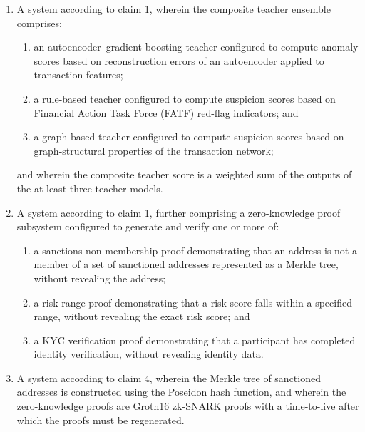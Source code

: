 \documentclass[12pt,a4paper]{article}
\begin{document}
\begin{enumerate}[label=\textbf{\arabic*.}]
\item A system according to claim 1, wherein the composite teacher ensemble 
comprises:
\begin{enumerate}[label=(\alph*)]
\item an autoencoder--gradient boosting teacher configured to compute 
anomaly scores based on reconstruction errors of an autoencoder applied to 
transaction features;
\item a rule-based teacher configured to compute suspicion scores based on 
Financial Action Task Force (FATF) red-flag indicators; and
\item a graph-based teacher configured to compute suspicion scores based on 
graph-structural properties of the transaction network;
\end{enumerate}
and wherein the composite teacher score is a weighted sum of the outputs of 
the at least three teacher models.

\item A system according to claim 1, further comprising a zero-knowledge 
proof subsystem configured to generate and verify one or more of:
\begin{enumerate}[label=(\alph*)]
\item a sanctions non-membership proof demonstrating that an address is not 
a member of a set of sanctioned addresses represented as a Merkle tree, 
without revealing the address;
\item a risk range proof demonstrating that a risk score falls within a 
specified range, without revealing the exact risk score; and
\item a KYC verification proof demonstrating that a participant has 
completed identity verification, without revealing identity data.
\end{enumerate}

\item A system according to claim 4, wherein the Merkle tree of sanctioned 
addresses is constructed using the Poseidon hash function, and wherein the 
zero-knowledge proofs are Groth16 zk-SNARK proofs with a time-to-live after 
which the proofs must be regenerated.


\end{enumerate}
\end{document}

